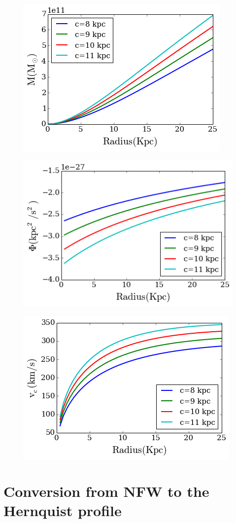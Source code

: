 \documentclass[a4paper, 12pt]{article} %
\begin{document}
\begin{figure}[H]
\centering
\includegraphics[scale=0.7]{NFW_mass.png}
\end{figure}

\begin{figure}[H]
\centering
\includegraphics[scale=0.7]{NFW_potential.png}
\end{figure}

\begin{figure}[H]
\centering
\includegraphics[scale=0.7]{NFW_vc.png}
\end{figure}



\section{Conversion from NFW to the Hernquist profile}
\end{document}
